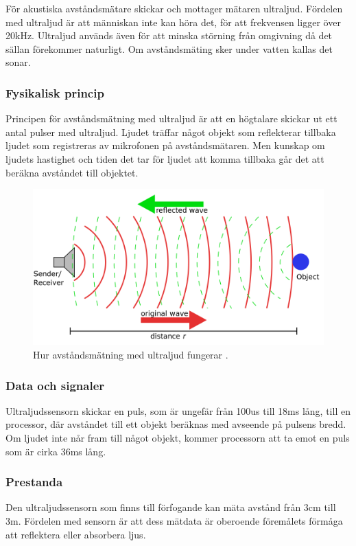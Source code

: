 \documentclass[11pt]{article}
\begin{document}
\begin{flushleft}
För akustiska avståndsmätare skickar och mottager mätaren ultraljud. Fördelen med ultraljud är att människan inte kan höra det, för att frekvensen ligger över 20kHz. Ultraljud används även för att minska störning från omgivning då det sällan förekommer naturligt. Om avståndsmäting sker under vatten kallas det sonar.      
 
\subsubsection{Fysikalisk princip}
Principen för avståndsmätning med ultraljud är att en högtalare skickar ut ett antal pulser med ultraljud. Ljudet träffar något objekt som reflekterar tillbaka ljudet som registreras av mikrofonen på avståndsmätaren. Men kunskap om ljudets hastighet och tiden det tar för ljudet att komma tillbaka går det att beräkna avståndet till objektet.
\\[0.1in]

\begin{figure}[H]
\centering
\includegraphics[scale=0.32]{sonar}
\caption{Hur avståndsmätning med ultraljud fungerar \autocite{sonar}.}
\label{fig:sonar}
\end{figure}

\subsubsection{Data och signaler}
Ultraljudssensorn skickar en puls, som är ungefär från 100us till 18ms lång, till en processor, där avståndet till ett objekt beräknas med avseende på pulsens bredd. Om ljudet inte når fram till något objekt, kommer processorn att ta emot en puls som är cirka 36ms lång.
 
\subsubsection{Prestanda}
Den ultraljudssensorn som finns till förfogande kan mäta avstånd från 3cm till 3m. Fördelen med sensorn är att dess mätdata är oberoende föremålets förmåga att reflektera eller absorbera ljus.  


\end{flushleft}
\end{document}
